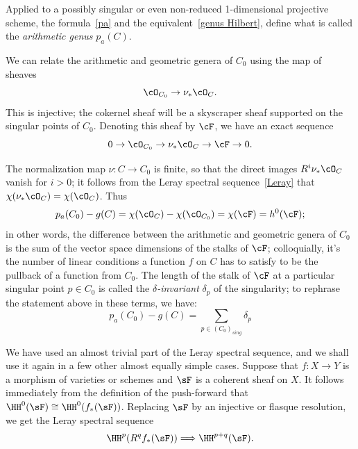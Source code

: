 Applied to a possibly singular or even non-reduced 1-dimensional projective scheme, the formula~\ref{pa} and the equivalent~\ref{genus Hilbert}, define
what is called the \emph{arithmetic genus} $p_a(C)$. 

We can relate the arithmetic and geometric genera of $C_0$ using the map of sheaves
$$
\cO_{C_0} \to \nu_*\cO_C.
$$
This is injective; the cokernel sheaf will be a skyscraper sheaf supported on the singular points of $C_0$. Denoting this sheaf by $\cF$, we have an exact sequence
$$
0 \to \cO_{C_0} \to \nu_*\cO_C \to \cF \to 0.
$$


The normalization map $\nu: C \to C_0$ is finite, so that the direct images $R^i\nu_*\cO_C$ vanish for $i > 0$; it follows from the Leray spectral sequence~\ref{Leray} that $\chi(\nu_*\cO_C) = \chi(\cO_C)$. Thus
$$
p_a(C_0) - g(C) =  \chi(\cO_{C}) -   \chi(\cO_{C_0}) = \chi(\cF) = h^0(\cF);
$$ 
in other words, the difference between the arithmetic and geometric genera of $C_0$ is the sum of the vector space dimensions of the stalks of $\cF$; colloquially, it's the number of linear conditions a function $f$ on $C$ has to satisfy to be the pullback of a function from $C_0$. The length of the stalk of $\cF$ at a particular singular point $p \in C_0$ is called the \emph{$\delta$-invariant} $\delta_p$ of the singularity; to rephrase the statement above in these terms, we have:
$$
p_a(C_0) - g(C) = \sum_{p \in (C_0)_{sing}} \delta_p
$$ 

\begin{fact}\label{Leray}
 We have used an almost trivial part of the Leray spectral sequence, and we shall use it again in a few other almost equally simple cases. Suppose that $f:X\to Y$ is a morphism of varieties or schemes
 and $\sF$ is a coherent sheaf on $X$.
  It follows immediately from the definition of the push-forward that $\HH^0(\sF) \cong \HH^0(f_*(\sF))$. Replacing
  $\sF$ by an injective or flasque resolution, we get the Leray spectral sequence
  $$
  \HH^p(R^qf_*(\sF)) \Longrightarrow \HH^{p+q}(\sF).
  $$
 \end{fact}
  


